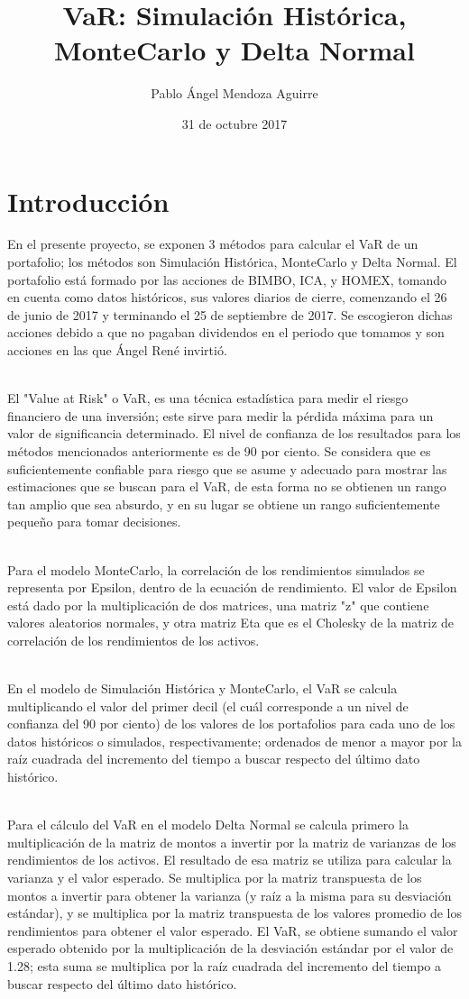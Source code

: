 \documentclass[12pt]{article}
\title{VaR: Simulación Histórica, MonteCarlo y Delta Normal}
\author{Pablo Ángel Mendoza Aguirre}
\date{31 de octubre 2017}
\begin{document}
\maketitle
\section{Introducción}

En el presente proyecto, se exponen 3 métodos para calcular el VaR de un portafolio; los métodos son Simulación Histórica, MonteCarlo y Delta Normal. El portafolio está formado por las acciones de BIMBO, ICA, y HOMEX, tomando en cuenta como datos históricos, sus valores diarios de cierre, comenzando el 26 de junio de 2017 y terminando el 25 de septiembre de 2017. Se escogieron dichas acciones debido a que no pagaban dividendos en el periodo que tomamos y son acciones en las que Ángel René invirtió.

\ \\%
El "Value at Risk" o VaR, es una técnica estadística para medir el riesgo financiero de una inversión; este sirve para medir la pérdida máxima para un valor de significancia determinado. El nivel de confianza de los resultados para los métodos mencionados anteriormente es de 90 por ciento. Se considera que es suficientemente confiable para riesgo que se asume y adecuado para mostrar las estimaciones que se buscan para el VaR, de esta forma no se obtienen un rango tan amplio que sea absurdo, y en su lugar se obtiene un rango suficientemente pequeño para tomar decisiones.

\ \\%
Para el modelo MonteCarlo, la correlación de los rendimientos simulados se representa por Epsilon, dentro de la ecuación de rendimiento. El valor de Epsilon está dado por la multiplicación de dos matrices, una matriz "z" que contiene valores aleatorios normales, y otra matriz Eta que es el Cholesky de la matriz de correlación de los rendimientos de los activos. 

\ \\%
En el modelo de Simulación Histórica y MonteCarlo, el VaR se calcula multiplicando el valor del primer decil (el cuál corresponde a un nivel de confianza del 90 por ciento) de los valores de los portafolios para cada uno de los datos históricos o simulados, respectivamente; ordenados de menor a mayor por la raíz cuadrada del incremento del tiempo a buscar respecto del último dato histórico.

\ \\%
Para el cálculo del VaR en el modelo Delta Normal se calcula primero la multiplicación de la matriz de montos a invertir por la matriz de varianzas de los rendimientos de los activos. 
El resultado de esa matriz se utiliza para calcular la varianza y el valor esperado.
Se multiplica por la matriz transpuesta de los montos a invertir para obtener la varianza (y raíz a la misma para su desviación estándar), y se multiplica por la matriz transpuesta de los valores promedio de los rendimientos para obtener el valor esperado. El VaR, se obtiene sumando el valor esperado obtenido por la multiplicación de la desviación estándar por el valor de 1.28; esta suma se multiplica por la raíz cuadrada del incremento del tiempo a buscar respecto del último dato histórico.
\newpage
\end{document}
